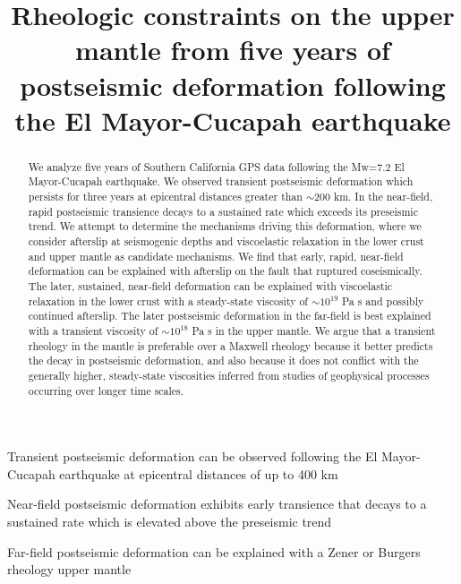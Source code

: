 \documentclass[draft,linenumbers]{AGUJournal}
\begin{document}
\title{Rheologic constraints on the upper mantle from five years of postseismic deformation following the El Mayor-Cucapah earthquake}

\begin{keypoints}
\item Transient postseismic deformation can be observed following the El Mayor-Cucapah earthquake at epicentral distances of up to 400 km
\item Near-field postseismic deformation exhibits early transience that decays to a sustained rate which is elevated above the preseismic trend 
\item Far-field postseismic deformation can be explained with a Zener or Burgers rheology upper mantle 
\end{keypoints}

\begin{abstract}
We analyze five years of Southern California GPS data following the Mw=7.2 El Mayor-Cucapah earthquake.  We observed transient postseismic deformation which persists for three years at epicentral distances greater than ${\sim}200$ km.  In the near-field, rapid postseismic transience decays to a sustained rate which exceeds its preseismic trend.  We attempt to determine the mechanisms driving this deformation, where we consider afterslip at seismogenic depths and viscoelastic relaxation in the lower crust and upper mantle as candidate mechanisms.  We find that early, rapid, near-field deformation can be explained with afterslip on the fault that ruptured coseismically. The later, sustained, near-field deformation can be explained with viscoelastic relaxation in the lower crust with a steady-state viscosity of ${\sim}10^{19}$ Pa s and possibly continued afterslip.  The later postseismic deformation in the far-field is best explained with a transient viscosity of ${\sim}10^{18}$ Pa s in the upper mantle. We argue that a transient rheology in the mantle is preferable over a Maxwell rheology because it better predicts the decay in postseismic deformation, and also because it does not conflict with the generally higher, steady-state viscosities inferred from studies of geophysical processes occurring over longer time scales.
\end{abstract}
\end{document}
